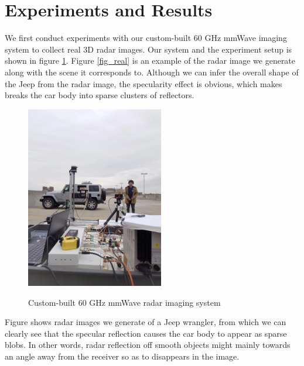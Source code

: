 \section{ Experiments and Results} \label{experiment}
We first conduct experiments with our custom-built 60 GHz mmWave imaging system to collect real 3D radar images. Our system and the experiment setup is shown in figure \ref{fig_exp}. Figure \ref{fig_real} is an example of the radar image we generate along with the scene it corresponds to. Although we can infer the overall shape of the Jeep from the radar image, the specularity effect is obvious, which makes breaks the car body into sparse clusters of reflectors.

\begin{figure}
	\centering
	\includegraphics[width=6cm,height=8cm]{./figure/exp_2.png}\\
	\caption{Custom-built 60 GHz mmWave radar imaging system}
	\label{fig_exp}
\end{figure}

 Figure shows radar images we generate of a Jeep wrangler, from which we can clearly see that the specular reflection causes the car body to appear as sparse blobs. In other words, radar reflection off smooth objects might mainly towards an angle away from the receiver so as to disappears in the image.
 
